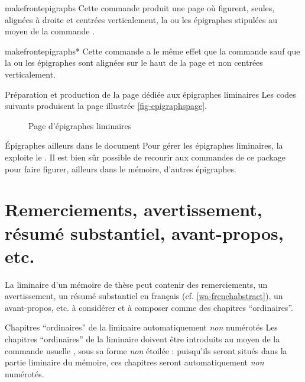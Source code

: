 \begin{docCommand}{makefrontepigraphs}{}
  Cette commande produit une page où figurent, seules, alignées à droite et
  centrées verticalement, la ou les épigraphes stipulées au moyen de la
  commande .
\end{docCommand}
%
\begin{docCommand}{makefrontepigraphs*}{}
  Cette commande a le même effet que la commande 
  sauf que la ou les épigraphes sont alignées sur le haut de la page et non
  centrées verticalement.
\end{docCommand}

\begin{dbexample}{Préparation et production de la page dédiée aux épigraphes
    liminaires}{}
  \NoAutoSpacing%
  Les codes suivants produisent la page illustrée \vref{fig-epigraphspage}.
\end{dbexample}

\begin{figure}[htbp]
  \centering
  \caption{Page d'épigraphes liminaires}
  \label{fig-epigraphspage}
\end{figure}

\begin{dbremark}{Épigraphes ailleurs dans le document}{}
  Pour gérer les épigraphes liminaires, la \yatCl{} exploite le
   . Il est bien sûr
  possible de recourir aux commandes de ce package pour faire figurer, ailleurs
  dans le mémoire, d'autres épigraphes.
\end{dbremark}

\section{Remerciements, avertissement, résumé substantiel, avant-propos, etc.}
%
%
%
%

La \gls{liminaire} d'un mémoire de thèse peut contenir des remerciements, un
avertissement, un résumé substantiel en français (cf. \vref{wa-frenchabstract}),
un avant-propos, etc.  à considérer et à composer comme des chapitres
\enquote{ordinaires}.

\begin{dbwarning}{Chapitres \enquote{ordinaires} de la \gls{liminaire}
    automatiquement \emph{non} numérotés}{}
  Les chapitres \enquote{ordinaires} de la \gls{liminaire} doivent être
  introduits au moyen de la commande usuelle , sous sa
  forme \emph{non} étoilée : puisqu'ils seront situés dans la partie liminaire
  du mémoire, ces chapitres seront automatiquement \emph{non} numérotés.
\end{dbwarning}


